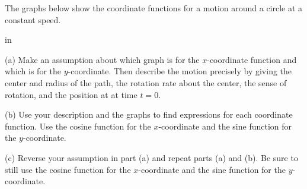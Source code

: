 \documentclass{ximera}
\newcommand{\pskip}{\vskip 0.1 in}
\begin{document}
\begin{example} \label{Ex2:Graphs}
The graphs below show the coordinate functions for a motion around a circle at a constant speed. 

\pskip


(a) Make an assumption about which graph is for the $x$-coordinate function and which is for the $y$-coordinate. Then describe the motion precisely by giving the center and radius of the path, the rotation rate about the center, the sense of rotation, and the position at at time $t=0$.

(b) Use your description and the graphs to find expressions for each coordinate function. Use the cosine function for the $x$-coordinate and the sine function for the $y$-coordinate.

(c) Reverse  your assumption in part (a) and repeat parts (a) and (b). Be sure to still use the cosine function for the $x$-coordinate and the sine function for the $y$-coordinate.


\begin{exploration}
 
\begin{onlineOnly}
    \begin{center}
\end{center}
\end{onlineOnly}
\end{exploration}

\end{example}
\end{document}
